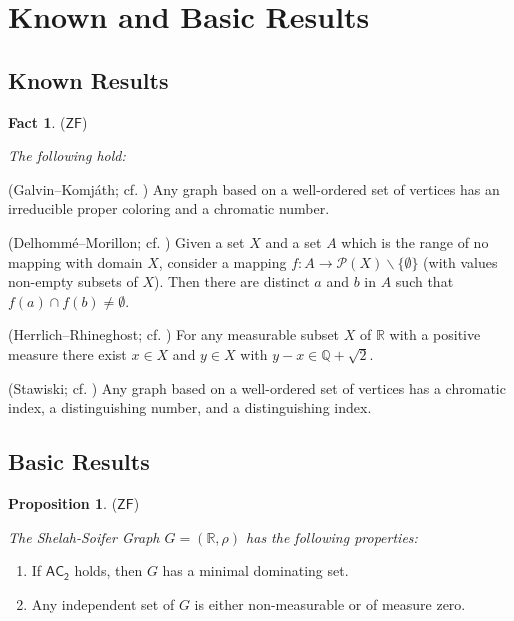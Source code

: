 \documentclass[12pt,reqno,a4paper]{amsart}
\theoremstyle{definition}
\newtheorem{fact}[defn]{Fact}
\newtheorem{prop}[defn]{Proposition}
\begin{document}
	\section{Known and Basic Results}
	\subsection{Known Results}
	\begin{fact} {($\mathsf{ZF}$)}
		{\em The following hold:
			\begin{enumerate}
				\item (Galvin--Komj\'{a}th; cf. \cite[Lemma 3 and the proof of Lemma 2]{GK1991}) Any graph based on a well-ordered set of vertices has an irreducible proper coloring and a chromatic number.
				
				\item {(Delhomm\'{e}--Morillon; cf. \cite[Lemma 1]{DM2006})
					Given a set $X$ and a set $A$ which is the range of no mapping with domain $X$, consider a mapping $f: A \rightarrow \mathcal{P}(X)\backslash \{\emptyset\}$ (with values non-empty subsets of $X$). Then there are distinct $a$ and $b$ in $A$ such that $f(a)\cap f(b) \neq \emptyset$.
					
					\item {(Herrlich--Rhineghost; cf. \cite[Theorem]{HR2005})} For any measurable subset $X$ of $\mathbb{R}$ with a positive measure there exist $x \in X$ and $y \in X$ with $y-x \in \mathbb{Q}+ \sqrt{2}$.
					\item (Stawiski; cf. \cite[proof of Theorem 3.8]{Sta2023}) Any graph based on a well-ordered set of vertices has a chromatic index, a distinguishing number, and a distinguishing index.
				}
			\end{enumerate}
		}
	\end{fact}
	
	\subsection{Basic Results}
	
	\begin{prop}{($\mathsf{ZF}$)}
		{\em The Shelah-Soifer Graph $G = (\mathbb{R},\rho)$ has the following properties:
			\begin{enumerate}
				\item If $\mathsf{AC_{2}}$ holds, then $G$ has a minimal dominating set.
				
				\item Any independent set of $G$ is either non-measurable or of measure zero.
			\end{enumerate}
		}
	\end{prop}
	
\end{document}
